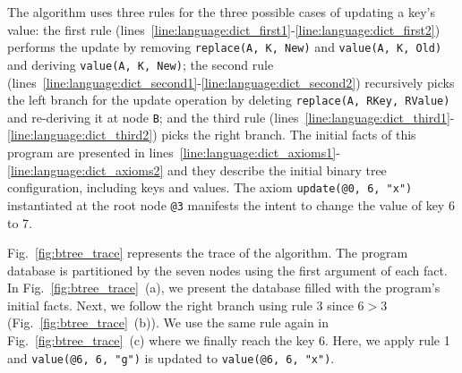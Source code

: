 The algorithm uses three rules for the three possible cases of updating a key's
value: the first rule
(lines~\ref{line:language:dict_first1}-\ref{line:language:dict_first2}) performs
the update by removing \texttt{replace(A, K, New)} and \texttt{value(A, K, Old)}
and deriving \texttt{value(A, K, New)}; the second rule
(lines~\ref{line:language:dict_second1}-\ref{line:language:dict_second2})
recursively picks the left branch for the update operation by deleting
\texttt{replace(A, RKey, RValue)} and re-deriving it at node \texttt{B}; and the
third rule
(lines~\ref{line:language:dict_third1}-\ref{line:language:dict_third2}) picks
the right branch.
The initial facts of this program are presented in
lines~\ref{line:language:dict_axioms1}-\ref{line:language:dict_axioms2} and they
describe the initial binary tree configuration, including keys and values.  The
axiom \texttt{update(@0, 6, "x")} instantiated at the root node \texttt{@3}
manifests the intent to change the value of key 6 to 7.

Fig.~\ref{fig:btree_trace} represents the trace of the algorithm. The program
database is partitioned by the seven nodes using the first argument of each
fact. In Fig.~\ref{fig:btree_trace}~(a), we present the database filled with the
program's initial facts. Next, we follow the right branch using rule 3 since $6 > 3$
(Fig.~\ref{fig:btree_trace}~(b)).  We use the same rule again in
Fig.~\ref{fig:btree_trace}~(c) where we finally reach the key 6. Here, we apply
rule 1 and \texttt{value(@6, 6, "g")} is updated to \texttt{value(@6, 6, "x")}.

